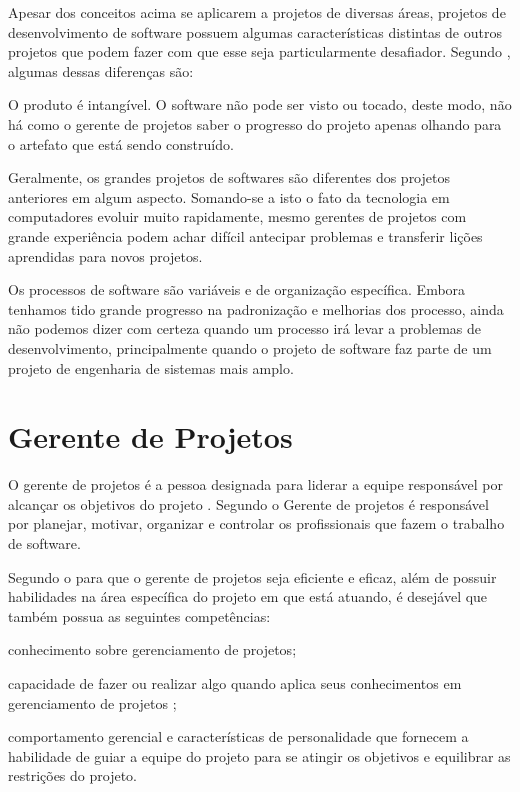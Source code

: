 \documentclass[
    12pt,               %
    openright,          %
    twoside,            %
    a4paper,            %
    chapter=TITLE,     %
    english,            %
    spanish,            %
    portuguese              %
    ]{abntex2}
\begin{document}
Apesar dos conceitos acima se aplicarem a projetos de diversas áreas, projetos de desenvolvimento de software possuem algumas características distintas de outros projetos que podem fazer com que esse seja particularmente desafiador. Segundo , algumas dessas diferenças são:

\begin{alineas}
	\item O produto é intangível. O software não pode ser visto ou tocado, deste modo, não há como o gerente de projetos saber o progresso do projeto apenas olhando para o artefato que está sendo construído.
	\item Geralmente, os grandes projetos de softwares são diferentes dos projetos anteriores em algum aspecto. Somando-se a isto o fato da tecnologia em computadores evoluir muito rapidamente, mesmo gerentes de projetos com grande experiência podem achar difícil antecipar problemas e transferir lições aprendidas para novos projetos.
	\item Os processos de software são variáveis e de organização específica. Embora tenhamos tido grande progresso na padronização e melhorias dos processo, ainda não podemos dizer com certeza quando um processo irá levar a problemas de desenvolvimento, principalmente quando o projeto de software faz parte de um projeto de engenharia de sistemas mais amplo.
\end{alineas}


\section{Gerente de Projetos}
O gerente de projetos é a pessoa designada para liderar a equipe responsável por alcançar os objetivos do projeto \cite[p.~16]{pmi2013}. Segundo  o Gerente de projetos é responsável por planejar, motivar, organizar e controlar os profissionais que fazem o trabalho de software.

Segundo o  para que o gerente de projetos seja eficiente e eficaz, além de possuir habilidades na área específica do projeto em que está atuando, é desejável que também possua as seguintes competências:

\begin{alineas}
	\item conhecimento sobre gerenciamento de projetos;
	\item capacidade de fazer ou realizar algo quando aplica seus conhecimentos em gerenciamento de projetos ;
	\item comportamento gerencial e características de personalidade que fornecem a habilidade de guiar a equipe do projeto para se atingir os objetivos e equilibrar as restrições do projeto.
\end{alineas}
\end{document}
